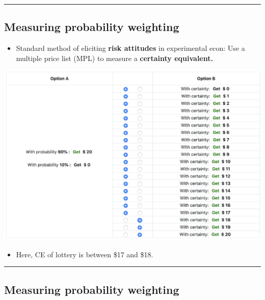 \documentclass[
  letterpaper,
  DIV=11,
  numbers=noendperiod]{scrartcl}
\providecommand{\tightlist}{%
  \setlength{\itemsep}{0pt}\setlength{\parskip}{0pt}}\usepackage{longtable,booktabs,array}
\begin{document}
\begin{center}\rule{0.5\linewidth}{0.5pt}\end{center}

\subsection{Measuring probability
weighting}\label{measuring-probability-weighting}

\begin{itemize}
\tightlist
\item
  Standard method of eliciting \textbf{risk attitudes} in experimental
  econ: Use a multiple price list (MPL) to measure a \textbf{certainty
  equivalent.}
\end{itemize}

\includegraphics[width=0.45\linewidth,height=\textheight,keepaspectratio]{figures/CognitiveUncertaintyMPL.png}

\begin{itemize}
\tightlist
\item
  Here, CE of lottery is between \$17 and \$18.
\end{itemize}

\begin{center}\rule{0.5\linewidth}{0.5pt}\end{center}

\subsection{Measuring probability
weighting}\label{measuring-probability-weighting-1}
\end{document}
